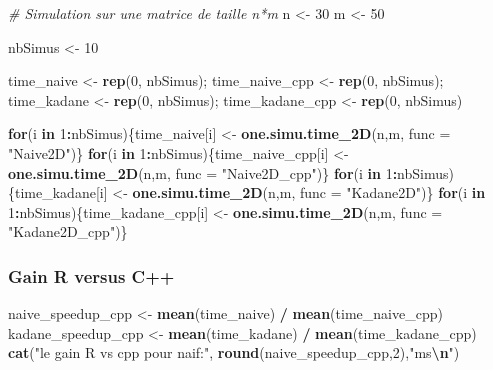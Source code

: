 \documentclass[
]{article}
\newenvironment{Shaded}{\begin{snugshade}}{\end{snugshade}}
\newcommand{\AttributeTok}[1]{\textcolor[rgb]{0.13,0.29,0.53}{#1}}
\newcommand{\CommentTok}[1]{\textcolor[rgb]{0.56,0.35,0.01}{\textit{#1}}}
\newcommand{\ControlFlowTok}[1]{\textcolor[rgb]{0.13,0.29,0.53}{\textbf{#1}}}
\newcommand{\DecValTok}[1]{\textcolor[rgb]{0.00,0.00,0.81}{#1}}
\newcommand{\FunctionTok}[1]{\textcolor[rgb]{0.13,0.29,0.53}{\textbf{#1}}}
\newcommand{\NormalTok}[1]{#1}
\newcommand{\OtherTok}[1]{\textcolor[rgb]{0.56,0.35,0.01}{#1}}
\newcommand{\SpecialCharTok}[1]{\textcolor[rgb]{0.81,0.36,0.00}{\textbf{#1}}}
\newcommand{\StringTok}[1]{\textcolor[rgb]{0.31,0.60,0.02}{#1}}
\begin{document}
\begin{Shaded}
\begin{Highlighting}[]
\CommentTok{\# Simulation sur une matrice de taille n*m}
\NormalTok{n }\OtherTok{\textless{}{-}} \DecValTok{30}
\NormalTok{m }\OtherTok{\textless{}{-}} \DecValTok{50}

\NormalTok{nbSimus }\OtherTok{\textless{}{-}} \DecValTok{10}

\NormalTok{time\_naive }\OtherTok{\textless{}{-}} \FunctionTok{rep}\NormalTok{(}\DecValTok{0}\NormalTok{, nbSimus); time\_naive\_cpp }\OtherTok{\textless{}{-}} \FunctionTok{rep}\NormalTok{(}\DecValTok{0}\NormalTok{, nbSimus);}
\NormalTok{time\_kadane }\OtherTok{\textless{}{-}} \FunctionTok{rep}\NormalTok{(}\DecValTok{0}\NormalTok{, nbSimus); time\_kadane\_cpp }\OtherTok{\textless{}{-}} \FunctionTok{rep}\NormalTok{(}\DecValTok{0}\NormalTok{, nbSimus)}

\ControlFlowTok{for}\NormalTok{(i }\ControlFlowTok{in} \DecValTok{1}\SpecialCharTok{:}\NormalTok{nbSimus)\{time\_naive[i] }\OtherTok{\textless{}{-}} \FunctionTok{one.simu.time\_2D}\NormalTok{(n,m, }\AttributeTok{func =} \StringTok{"Naive2D"}\NormalTok{)\}}
\ControlFlowTok{for}\NormalTok{(i }\ControlFlowTok{in} \DecValTok{1}\SpecialCharTok{:}\NormalTok{nbSimus)\{time\_naive\_cpp[i] }\OtherTok{\textless{}{-}} \FunctionTok{one.simu.time\_2D}\NormalTok{(n,m, }\AttributeTok{func =} \StringTok{"Naive2D\_cpp"}\NormalTok{)\}}
\ControlFlowTok{for}\NormalTok{(i }\ControlFlowTok{in} \DecValTok{1}\SpecialCharTok{:}\NormalTok{nbSimus)\{time\_kadane[i] }\OtherTok{\textless{}{-}} \FunctionTok{one.simu.time\_2D}\NormalTok{(n,m, }\AttributeTok{func =} \StringTok{"Kadane2D"}\NormalTok{)\}}
\ControlFlowTok{for}\NormalTok{(i }\ControlFlowTok{in} \DecValTok{1}\SpecialCharTok{:}\NormalTok{nbSimus)\{time\_kadane\_cpp[i] }\OtherTok{\textless{}{-}} \FunctionTok{one.simu.time\_2D}\NormalTok{(n,m, }\AttributeTok{func =} \StringTok{"Kadane2D\_cpp"}\NormalTok{)\}}
\end{Highlighting}
\end{Shaded}

\subsubsection{Gain R versus C++}\label{gain-r-versus-c}

\begin{Shaded}
\begin{Highlighting}[]
\NormalTok{naive\_speedup\_cpp }\OtherTok{\textless{}{-}} \FunctionTok{mean}\NormalTok{(time\_naive) }\SpecialCharTok{/} \FunctionTok{mean}\NormalTok{(time\_naive\_cpp)}
\NormalTok{kadane\_speedup\_cpp }\OtherTok{\textless{}{-}} \FunctionTok{mean}\NormalTok{(time\_kadane) }\SpecialCharTok{/} \FunctionTok{mean}\NormalTok{(time\_kadane\_cpp)}
\FunctionTok{cat}\NormalTok{(}\StringTok{"le gain R vs cpp pour naif:"}\NormalTok{, }\FunctionTok{round}\NormalTok{(naive\_speedup\_cpp,}\DecValTok{2}\NormalTok{),}\StringTok{"ms}\SpecialCharTok{\textbackslash{}n}\StringTok{"}\NormalTok{)}
\end{Highlighting}
\end{Shaded}
\end{document}
